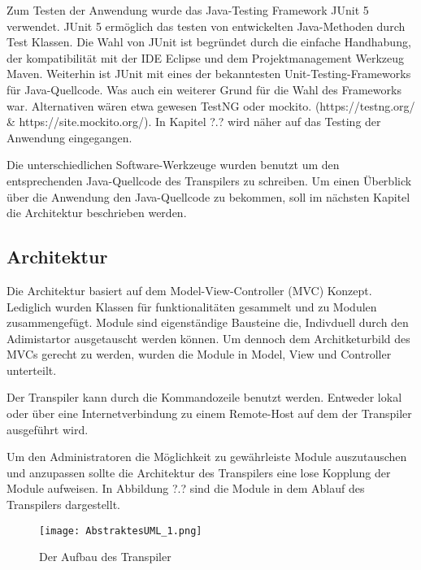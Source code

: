 Zum Testen der Anwendung wurde das Java-Testing Framework JUnit 5 verwendet. JUnit 5 ermöglich das testen von entwickelten Java-Methoden durch Test Klassen.
Die Wahl von JUnit ist begründet durch die einfache Handhabung, der kompatibilität mit der IDE Eclipse und dem Projektmanagement Werkzeug Maven. Weiterhin ist JUnit mit eines der bekanntesten Unit-Testing-Frameworks für Java-Quellcode. Was auch ein weiterer Grund für die Wahl des Frameworks war. Alternativen wären etwa gewesen TestNG oder mockito. (https://testng.org/ & https://site.mockito.org/).
In Kapitel ?.? wird näher auf das Testing der Anwendung eingegangen. 



Die unterschiedlichen Software-Werkzeuge wurden benutzt um den entsprechenden Java-Quellcode des Transpilers zu schreiben.
Um einen Überblick über die Anwendung den Java-Quellcode zu bekommen, soll im nächsten Kapitel die Architektur beschrieben werden.

\subsection{Architektur} 

Die Architektur basiert auf dem Model-View-Controller (MVC) Konzept. Lediglich wurden Klassen für funktionalitäten gesammelt und zu Modulen zusammengefügt.
Module sind eigenständige Bausteine die, Indivduell durch den Adimistartor ausgetauscht werden können.
Um dennoch dem Architketurbild des MVCs gerecht zu werden, wurden die Module in Model, View und Controller unterteilt.

Der Transpiler kann durch die Kommandozeile benutzt werden. Entweder lokal oder über eine Internetverbindung zu einem Remote-Host auf dem der Transpiler ausgeführt wird. 

Um den Administratoren die Möglichkeit zu gewährleiste Module auszutauschen und anzupassen sollte die Architektur des Transpilers eine lose Kopplung der Module aufweisen. In Abbildung ?.? sind die Module in dem Ablauf des Transpilers dargestellt.

\begin{figure}[h]
	\centering
	\caption{Der Aufbau des Transpiler}
	\texttt{[image: AbstraktesUML\_1.png]}
	\label{fig:modules}
\end{figure}

